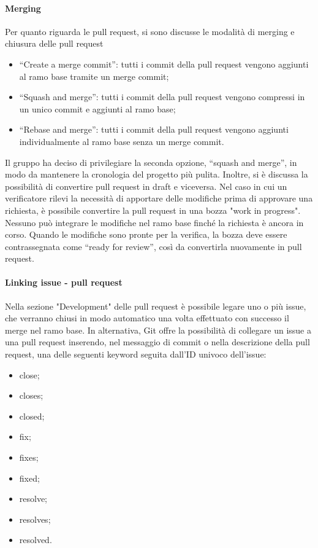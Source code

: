 \paragraph{Merging}
Per quanto riguarda le pull request, si sono discusse le modalità di merging e chiusura delle pull request
\begin{itemize}
	\item “Create a merge commit”: tutti i commit della pull request vengono aggiunti al ramo base tramite un merge commit;
	\item “Squash and merge”: tutti i commit della pull request vengono compressi in un unico commit e aggiunti al ramo base;
	\item “Rebase and merge”: tutti i commit della pull request vengono aggiunti individualmente al ramo base senza un merge commit.
\end{itemize}
Il gruppo ha deciso di privilegiare la seconda opzione, “squash and merge”, in modo da mantenere la cronologia del progetto più pulita. Inoltre, si è discussa la possibilità di convertire pull request in draft e viceversa. Nel caso in cui un verificatore rilevi la necessità di apportare delle modifiche prima di approvare una richiesta, è possibile convertire la pull request in una bozza "work in progress". Nessuno può integrare le modifiche nel ramo base finché la richiesta è ancora in corso. Quando le modifiche sono pronte per la verifica, la bozza deve essere contrassegnata come “ready for review”, così da convertirla nuovamente in pull request.


\paragraph{Linking issue - pull request}
Nella sezione "Development" delle pull request è possibile legare uno o più issue, che verranno chiusi in modo automatico una volta effettuato con successo il merge nel ramo base. In alternativa, Git offre la possibilità di collegare un issue a una pull request inserendo, nel messaggio di commit o nella descrizione della pull request, una delle seguenti keyword seguita dall’ID univoco dell’issue:
\begin{itemize}
	\item close;
	\item closes;
	\item closed;
	\item fix;
	\item fixes;
	\item fixed;
	\item resolve;
	\item resolves;
	\item resolved.
\end{itemize}


